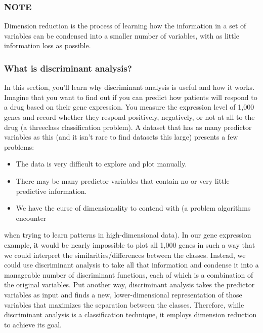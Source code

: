 \documentclass[
]{article}
\providecommand{\tightlist}{%
  \setlength{\itemsep}{0pt}\setlength{\parskip}{0pt}}
\begin{document}
\subsubsection{NOTE}\label{note-8}

Dimension reduction is the process of learning how the information in a
set of variables can be condensed into a smaller number of variables,
with as little information loss as possible.

\subsubsection{What is discriminant
analysis?}\label{what-is-discriminant-analysis}

In this section, you'll learn why discriminant analysis is useful and
how it works. Imagine that you want to find out if you can predict how
patients will respond to a drug based on their gene expression. You
measure the expression level of 1,000 genes and record whether they
respond positively, negatively, or not at all to the drug (a threeclass
classification problem). A dataset that has as many predictor variables
as this (and it isn't rare to find datasets this large) presents a few
problems:

\begin{itemize}
\tightlist
\item
  The data is very difficult to explore and plot manually.
\item
  There may be many predictor variables that contain no or very little
  predictive information.
\item
  We have the curse of dimensionality to contend with (a problem
  algorithms encounter
\end{itemize}

when trying to learn patterns in high-dimensional data). In our gene
expression example, it would be nearly impossible to plot all 1,000
genes in such a way that we could interpret the similarities/differences
between the classes. Instead, we could use discriminant analysis to take
all that information and condense it into a manageable number of
discriminant functions, each of which is a combination of the original
variables. Put another way, discriminant analysis takes the predictor
variables as input and finds a new, lower-dimensional representation of
those variables that maximizes the separation between the classes.
Therefore, while discriminant analysis is a classification technique, it
employs dimension reduction to achieve its goal.
\end{document}
